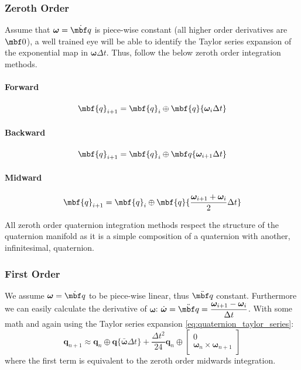 \documentclass[10pt,a4paper]{article}
\newcommand{\mbs}[1]{{\boldsymbol{#1}}}
\numberwithin{equation}{section}
\begin{document}
\subsubsection{Zeroth Order}
Assume that $\mbs \omega = \dot{\mbf q}$ is piece-wise constant (all higher order derivatives are $\mbf 0$), a well trained eye will be able to identify the Taylor series expansion of the exponential map in $\mbs \omega \Delta t$. Thus, follow the below zeroth order integration methods.

\paragraph{Forward}
\begin{equation}
\mbf{q}_{i+1} = \mbf{q}_i \oplus \mbf{q}\lbrace \mbs{\omega}_i \Delta t \rbrace
\end{equation}

\paragraph{Backward}
\begin{equation}
\mbf{q}_{i+1} = \mbf{q}_i \oplus \mbf q \lbrace \mbs{\omega}_{i+1} \Delta t \rbrace
\end{equation}

\paragraph{Midward}
\begin{equation}
\mbf{q}_{i+1} = \mbf{q}_i \oplus \mbf{q}\lbrace \dfrac{\mbs{\omega}_{i+1} + \mbs{\omega}_{i}}{2} \Delta t \rbrace
\end{equation}

All zeroth order quaternion integration methods respect the structure of the quaternion manifold as it is a simple composition of a quaternion with another, infinitesimal, quaternion.

\subsubsection{First Order}

We assume $\mbs \omega = \dot{\mbf q}$ to be piece-wise linear, thus $\ddot{\mbf q}$ constant.
Furthermore we can easily calculate the derivative of $\mbs \omega$: $\dot{\mbs \omega} = \ddot{\mbf q} = \dfrac{\mbs \omega_{i+1} - \mbs \omega_i}{\Delta t}$. 
With some math and again using the Taylor series expansion \eqref{eq:quaternion_taylor_series}:
\begin{equation}
\textbf{q}_{n + 1} \approx \textbf{q}_n \oplus \textbf{q}\lbrace \bar{\bm{\omega}} \Delta t \rbrace
+ \dfrac{\Delta t^2}{24} \textbf{q}_n \oplus \begin{bmatrix}
0 \\ \bm \omega_n \times \bm \omega_{n+1}
\end{bmatrix}
\end{equation}
where the first term is equivalent to the zeroth order midwards integration.
\end{document}
